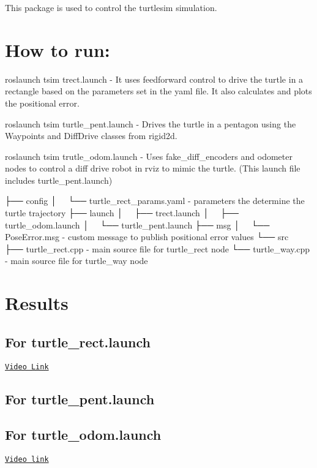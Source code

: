 This package is used to control the turtlesim simulation.

\section*{How to run\+:}

{\ttfamily roslaunch tsim trect.\+launch} -\/ It uses feedforward control to drive the turtle in a rectangle based on the parameters set in the yaml file. It also calculates and plots the positional error.

{\ttfamily roslaunch tsim turtle\+\_\+pent.\+launch} -\/ Drives the turtle in a pentagon using the Waypoints and Diff\+Drive classes from rigid2d.

{\ttfamily roslaunch tsim trutle\+\_\+odom.\+launch} -\/ Uses {\ttfamily fake\+\_\+diff\+\_\+encoders} and {\ttfamily odometer} nodes to control a diff drive robot in rviz to mimic the turtle. (This launch file includes {\ttfamily turtle\+\_\+pent.\+launch})


\begin{DoxyCode}
├── config
│   └── turtle\_rect\_params.yaml - parameters the determine the turtle trajectory
├── launch
│   ├── trect.launch
│   ├── turtle\_odom.launch
│   └── turtle\_pent.launch
├── msg
│   └── PoseError.msg - custom message to publish positional error values
└── src
    ├── turtle\_rect.cpp - main source file for turtle\_rect node
    └── turtle\_way.cpp - main source file for turtle\_way node
\end{DoxyCode}


\section*{Results}

\subsection*{For {\ttfamily turtle\+\_\+rect.\+launch}}

\href{https://youtu.be/aji3aDB8LBI}{\tt Video Link}

  

\subsection*{For {\ttfamily turtle\+\_\+pent.\+launch}}



\subsection*{For {\ttfamily turtle\+\_\+odom.\+launch}}

\href{https://youtu.be/058QKyPgfmI}{\tt Video link} 